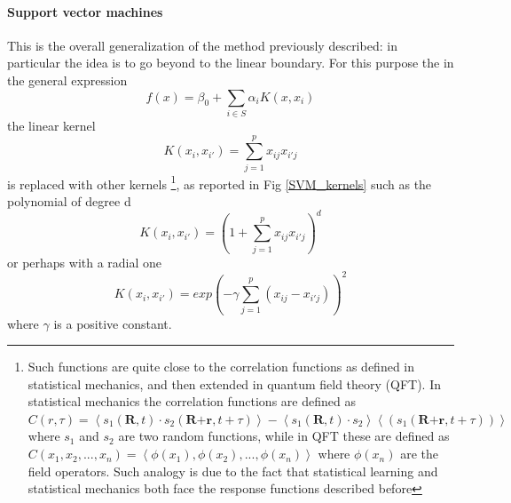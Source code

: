 \documentclass[
12pt, %
a4paper, %
oneside, %
headinclude,footinclude, %
BCOR5mm, %
]{scrartcl}
\begin{document}
\paragraph{Support vector machines}
This is the overall generalization of the method previously described: in particular the idea is to go beyond to the linear boundary. For this purpose the in the general expression \cite{james2013introduction}
\begin{equation}
f(x)=\beta_{0}+\sum_{i\in S}\alpha_{i}K(x,x_{i}) 
\end{equation}
the linear kernel \cite{james2013introduction}
\begin{equation}
K(x_{i},x_{i'})=\sum^{p}_{j=1}x_{ij}x_{i'j}
\end{equation}
is replaced with other kernels \footnote{Such functions are quite close to the correlation functions as defined in statistical mechanics, and then extended in quantum field theory (QFT). In statistical mechanics the correlation functions are defined as \cite{huang1963statistical} $C(r,\tau)= \left\langle s_{1}(\textbf{R},t)\cdot s_{2}(\textbf{R+r},t+\tau)\right\rangle -  \left\langle s_{1}(\textbf{R},t)\cdot s_{2}\right\rangle\left\langle( s_{1}(\textbf{R+r},t+\tau))\right\rangle $ where $s_{1}$ and $s_{2}$ are two random functions, while in QFT these are defined as \cite{zee2010quantum}  $C(x_{1},x_{2},...,x_{n})=\left\langle \phi (x_{1}),\phi(x_{2}),...,\phi(x_{n}) \right\rangle$ where $\phi(x_{n})$ are the field operators. Such analogy is due to the fact that statistical learning and statistical mechanics both face the response functions described before}, as reported in Fig \ref{SVM_kernels} such as the polynomial of degree d \cite{james2013introduction}
\begin{equation}
K(x_{i},x_{i'})=\left(1+\sum_{j=1}^{p}x_{ij}x_{i'j}\right)^{d}
\end{equation}
or perhaps with a radial one \cite{james2013introduction}
\begin{equation}
K(x_{i},x_{i'})=exp\left(-\gamma\sum^{p}_{j=1}\left(x_{ij}-x_{i'j}\right)\right)^{2}
\end{equation}
where $\gamma$ is a positive constant. 
\end{document}
